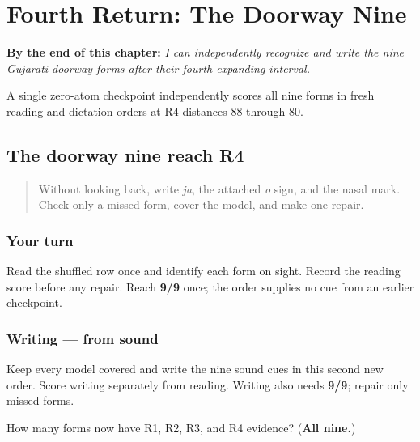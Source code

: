 
\chapter{Fourth Return: The Doorway Nine}
\label{ch:gu-doorway-r4}

\begin{chapteropening}
\textbf{By the end of this chapter:} \emph{I can independently recognize and write the nine Gujarati doorway forms after their fourth expanding interval.}

A single zero-atom checkpoint independently scores all nine forms in fresh reading and dictation orders at R4 distances 88 through 80.
\end{chapteropening}

\section[o sign — ka — nasal mark — ja …]{The doorway nine reach R4}

\label{lesson:GU-R19-doorway-nine-r4}



\begin{quote}
Without looking back, write \emph{ja}, the attached \emph{o} sign, and the nasal mark. Check only a missed form, cover the model, and make one repair.
\end{quote}

\subsection*{Your turn}
Read the shuffled row once and identify each form on sight. Record the reading score before any repair. Reach \textbf{9/9} once; the order supplies no cue from an earlier checkpoint.

\subsection*{Writing — from sound}
Keep every model covered and write the nine sound cues in this second new order. Score writing separately from reading. Writing also needs \textbf{9/9}; repair only missed forms.

\begin{tcolorbox}[breakable,colback=teal!4,colframe=teal!35!black,title={Before you move on}]
How many forms now have R1, R2, R3, and R4 evidence? (\textbf{All nine.})
\end{tcolorbox}
